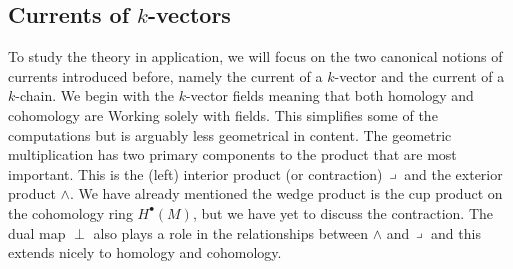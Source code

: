 \documentclass{article}
\begin{document}


\subsection{Currents of $k$-vectors}

To study the theory in application, we will focus on the two canonical notions of currents introduced before, namely the current of a $k$-vector and the current of a $k$-chain. We begin with the $k$-vector fields meaning that both homology and cohomology are Working solely with fields. This simplifies some of the computations but is arguably less geometrical in content. The geometric multiplication has two primary components to the product that are most important. This is the (left) interior product (or contraction) $\hspace*{.5mm}\lrcorner \hspace*{.5mm}$ and the exterior product $\wedge$. We have already mentioned the wedge product is the cup product on the cohomology ring $H^\bullet(M)$, but we have yet to discuss the contraction. The dual map $\perp$ also plays a role in the relationships between $\wedge$ and $\hspace*{.5mm}\lrcorner \hspace*{.5mm}$ and this extends nicely to homology and cohomology.
\end{document}
